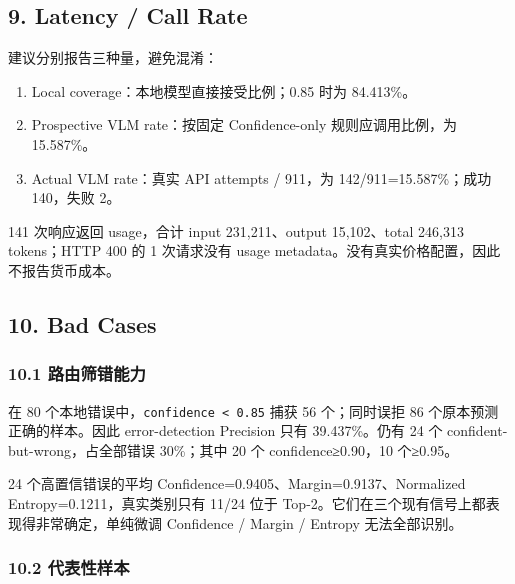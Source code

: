 \documentclass[
  a4paper,
]{article}
\providecommand{\tightlist}{%
  \setlength{\itemsep}{0pt}\setlength{\parskip}{0pt}}
\begin{document}
\hypertarget{9-latency--call-rate}{%
\subsection{9. Latency / Call Rate}\label{9-latency--call-rate}}

建议分别报告三种量，避免混淆：

\begin{enumerate}
\def\labelenumi{\arabic{enumi}.}
\tightlist
\item
  Local coverage：本地模型直接接受比例；0.85 时为 84.413\%。
\item
  Prospective VLM rate：按固定 Confidence-only 规则应调用比例，为
  15.587\%。
\item
  Actual VLM rate：真实 API attempts / 911，为 142/911=15.587\%；成功
  140，失败 2。
\end{enumerate}

141 次响应返回 usage，合计 input 231,211、output 15,102、total 246,313
tokens；HTTP 400 的 1 次请求没有 usage
metadata。没有真实价格配置，因此不报告货币成本。

\hypertarget{10-bad-cases}{%
\subsection{10. Bad Cases}\label{10-bad-cases}}

\hypertarget{101-ux8defux7531ux7b5bux9519ux80fdux529b}{%
\subsubsection{10.1
路由筛错能力}\label{101-ux8defux7531ux7b5bux9519ux80fdux529b}}

在 80 个本地错误中，\texttt{confidence\ \textless{}\ 0.85} 捕获 56
个；同时误拒 86 个原本预测正确的样本。因此 error-detection Precision
只有 39.437\%。仍有 24 个 confident-but-wrong，占全部错误 30\%；其中 20
个 confidence≥0.90，10 个≥0.95。

24 个高置信错误的平均 Confidence=0.9405、Margin=0.9137、Normalized
Entropy=0.1211，真实类别只有 11/24 位于
Top-2。它们在三个现有信号上都表现得非常确定，单纯微调 Confidence /
Margin / Entropy 无法全部识别。

\hypertarget{102-ux4ee3ux8868ux6027ux6837ux672c}{%
\subsubsection{10.2
代表性样本}\label{102-ux4ee3ux8868ux6027ux6837ux672c}}
\end{document}
